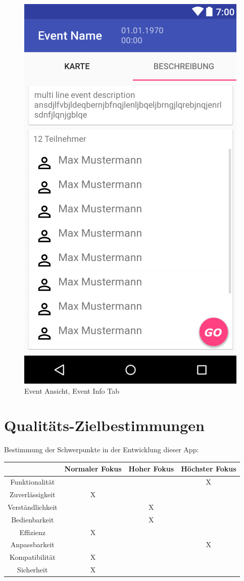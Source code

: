 \documentclass[parskip=full]{scrartcl}
\begin{document}
\begin{figure}[H]
	\centering
	\includegraphics[width=.7\textwidth]{GUI/AndroidStudio/event_info_teilnehmer.PNG}
	\caption{Event Ansicht, Event Info Tab}	
\end{figure}


\newpage
\section{Qualitäts-Zielbestimmungen}
Bestimmung der Schwerpunkte in der Entwicklung dieser App:

\begin{table}[!h]
	\begin{center}
		\begin{tabular}{|c||c|c|c|}
			\hline  & Normaler Fokus & Hoher Fokus & Höchster Fokus\\
			\hline  Funktionalität & & & X \\
			\hline  Zuverlässigkeit & X & &\\
			\hline  Verständlichkeit & & X & \\
			\hline  Bedienbarkeit & & X &\\
			\hline  Effizienz & X & & \\
			\hline  Anpassbarkeit & & & X \\
			\hline  Kompatibilität & X & &\\
			\hline  Sicherheit & X & &\\
			\hline
		\end{tabular}
	\end{center}
\end{table}
\end{document}
